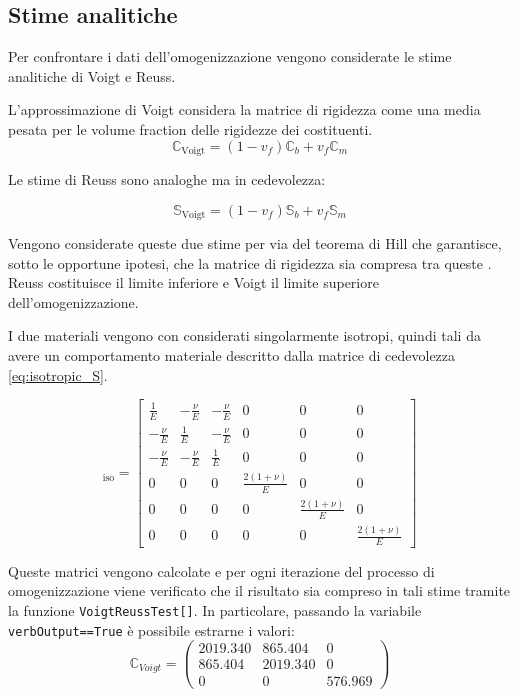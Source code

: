 \documentclass[a4paper,num-refs]{oup-contemporary}
\begin{document}
\subsection{Stime analitiche}

Per confrontare i dati dell'omogenizzazione vengono considerate le stime analitiche di Voigt e Reuss. 

L'approssimazione di Voigt considera la matrice di rigidezza come una media pesata per le volume fraction delle rigidezze dei costituenti. 
\begin{equation}
	\mathbb C_{\operatorname{Voigt}}=(1-v_f)\mathbb C_b+v_f \mathbb C_m
\end{equation}

Le stime di Reuss sono analoghe ma in cedevolezza:

\begin{equation}
	\mathbb S_{\operatorname{Voigt}}=(1-v_f)\mathbb S_b+v_f \mathbb S_m
\end{equation}

Vengono considerate queste due stime per via del teorema di Hill che garantisce, sotto le opportune ipotesi, che la matrice di rigidezza sia compresa tra queste \citep{ABOUDI201387}. Reuss costituisce il limite inferiore e Voigt il limite superiore dell'omogenizzazione. 

I due materiali vengono con considerati singolarmente isotropi, quindi tali da avere un comportamento materiale descritto dalla matrice di cedevolezza  \eqref{eq:isotropic_S}.

\begin{equation}
[\mathbb S]_{\operatorname{iso}}=\left[\begin{array}{cccccc}
	\frac{1}{E} & -\frac{\nu}{E} & -\frac{\nu}{E} & 0 & 0 & 0 \\
	-\frac{\nu}{E} & \frac{1}{E} & -\frac{\nu}{E} & 0 & 0 & 0 \\
	-\frac{\nu}{E} & -\frac{\nu}{E} & \frac{1}{E} & 0 & 0 & 0 \\
	0 & 0 & 0 & \frac{2(1+\nu)}{E} & 0 & 0 \\
	0 & 0 & 0 & 0 & \frac{2(1+\nu)}{E} & 0 \\
	0 & 0 & 0 & 0 & 0 & \frac{2(1+\nu)}{E}
\end{array}\right]
\label{eq:isotropic_S}
\end{equation}

Queste matrici vengono calcolate e per ogni iterazione del processo di omogenizzazione viene verificato che il risultato sia compreso in tali stime tramite la funzione \texttt{VoigtReussTest[]}. In particolare, passando la variabile \texttt{verbOutput==True} è possibile estrarne i valori:
\begin{equation}
\mathbb C_{Voigt}=\begin{pmatrix}
	2019.340&865.404&0\\
	865.404&2019.340&0\\
	0&0&576.969
	
\end{pmatrix}
\end{equation}
\end{document}
